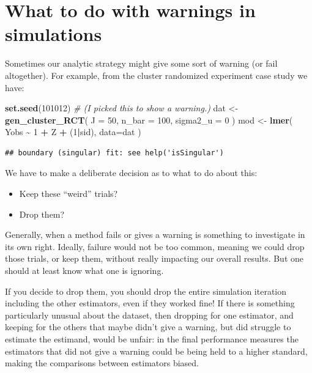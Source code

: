\documentclass[
]{book}
\newenvironment{Shaded}{\begin{snugshade}}{\end{snugshade}}
\newcommand{\AttributeTok}[1]{\textcolor[rgb]{0.13,0.29,0.53}{#1}}
\newcommand{\CommentTok}[1]{\textcolor[rgb]{0.56,0.35,0.01}{\textit{#1}}}
\newcommand{\DecValTok}[1]{\textcolor[rgb]{0.00,0.00,0.81}{#1}}
\newcommand{\FunctionTok}[1]{\textcolor[rgb]{0.13,0.29,0.53}{\textbf{#1}}}
\newcommand{\NormalTok}[1]{#1}
\newcommand{\OtherTok}[1]{\textcolor[rgb]{0.56,0.35,0.01}{#1}}
\newcommand{\SpecialCharTok}[1]{\textcolor[rgb]{0.81,0.36,0.00}{\textbf{#1}}}
\providecommand{\tightlist}{%
  \setlength{\itemsep}{0pt}\setlength{\parskip}{0pt}}
\begin{document}
\section{What to do with warnings in simulations}\label{what-to-do-with-warnings-in-simulations}

Sometimes our analytic strategy might give some sort of warning (or fail altogether).
For example, from the cluster randomized experiment case study we have:

\begin{Shaded}
\begin{Highlighting}[]
\FunctionTok{set.seed}\NormalTok{(}\DecValTok{101012}\NormalTok{)  }\CommentTok{\# (I picked this to show a warning.)}
\NormalTok{dat }\OtherTok{\textless{}{-}} \FunctionTok{gen\_cluster\_RCT}\NormalTok{( }\AttributeTok{J =} \DecValTok{50}\NormalTok{, }\AttributeTok{n\_bar =} \DecValTok{100}\NormalTok{, }\AttributeTok{sigma2\_u =} \DecValTok{0}\NormalTok{ )}
\NormalTok{mod }\OtherTok{\textless{}{-}} \FunctionTok{lmer}\NormalTok{( Yobs }\SpecialCharTok{\textasciitilde{}} \DecValTok{1} \SpecialCharTok{+}\NormalTok{ Z }\SpecialCharTok{+}\NormalTok{ (}\DecValTok{1}\SpecialCharTok{|}\NormalTok{sid), }\AttributeTok{data=}\NormalTok{dat )}
\end{Highlighting}
\end{Shaded}

\begin{verbatim}
## boundary (singular) fit: see help('isSingular')
\end{verbatim}

We have to make a deliberate decision as to what to do about this:

\begin{itemize}
\tightlist
\item
  Keep these ``weird'' trials?
\item
  Drop them?
\end{itemize}

Generally, when a method fails or gives a warning is something to investigate in its own right.
Ideally, failure would not be too common, meaning we could drop those trials, or keep them, without really impacting our overall results.
But one should at least know what one is ignoring.

If you decide to drop them, you should drop the entire simulation iteration including the other estimators, even if they worked fine!
If there is something particularly unusual about the dataset, then dropping for one estimator, and keeping for the others that maybe didn't give a warning, but did struggle to estimate the estimand, would be unfair: in the final performance measures the estimators that did not give a warning could be being held to a higher standard, making the comparisons between estimators biased.
\end{document}
